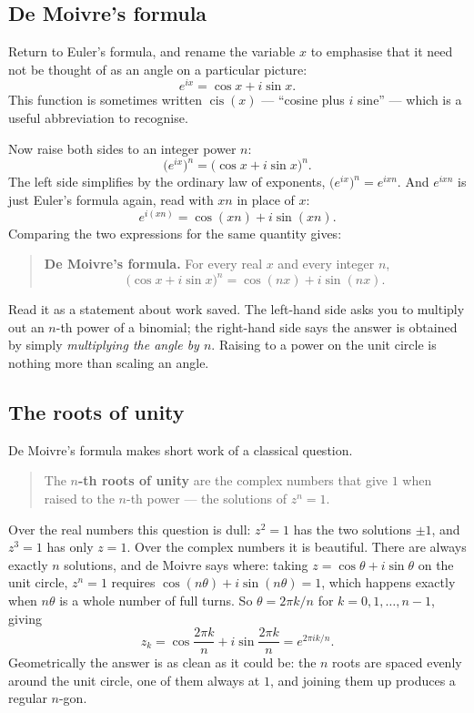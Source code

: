 \documentclass[11pt]{article}
\theoremstyle{definition}
\theoremstyle{remark}
\begin{document}
\subsection{De Moivre's formula}
Return to Euler's formula, and rename the variable $x$ to emphasise that it need
not be thought of as an angle on a particular picture:
\[
  e^{ix} = \cos x + i\sin x .
\]
This function is sometimes written $\operatorname{cis}(x)$ --- ``cosine plus
$i$ sine'' --- which is a useful abbreviation to recognise.

Now raise both sides to an integer power $n$:
\[
  \bigl(e^{ix}\bigr)^{n} = \bigl(\cos x + i\sin x\bigr)^{n} .
\]
The left side simplifies by the ordinary law of exponents,
$\bigl(e^{ix}\bigr)^{n}=e^{ixn}$. And $e^{ixn}$ is just Euler's formula again,
read with $xn$ in place of $x$:
\[
  e^{i(xn)} = \cos(xn) + i\sin(xn) .
\]
Comparing the two expressions for the same quantity gives:

\begin{quote}
\textbf{De Moivre's formula.} For every real $x$ and every integer $n$,
\[
  \bigl(\cos x + i\sin x\bigr)^{n} = \cos(nx) + i\sin(nx) .
\]
\end{quote}

\noindent Read it as a statement about work saved. The left-hand side asks you
to multiply out an $n$-th power of a binomial; the right-hand side says the
answer is obtained by simply \emph{multiplying the angle by $n$}. Raising to a
power on the unit circle is nothing more than scaling an angle.

\subsection{The roots of unity}
De Moivre's formula makes short work of a classical question.

\begin{quote}
The \textbf{$n$-th roots of unity} are the complex numbers that give $1$ when
raised to the $n$-th power --- the solutions of $z^{n}=1$.
\end{quote}

\noindent Over the real numbers this question is dull: $z^{2}=1$ has the two
solutions $\pm1$, and $z^{3}=1$ has only $z=1$. Over the complex numbers it is
beautiful. There are always exactly $n$ solutions, and de Moivre says where:
taking $z=\cos\theta+i\sin\theta$ on the unit circle, $z^{n}=1$ requires
$\cos(n\theta)+i\sin(n\theta)=1$, which happens exactly when $n\theta$ is a
whole number of full turns. So $\theta=2\pi k/n$ for $k=0,1,\dots,n-1$, giving
\[
  z_k = \cos\frac{2\pi k}{n} + i\sin\frac{2\pi k}{n} = e^{2\pi i k/n}.
\]
Geometrically the answer is as clean as it could be: the $n$ roots are spaced
evenly around the unit circle, one of them always at $1$, and joining them up
produces a regular $n$-gon.
\end{document}
